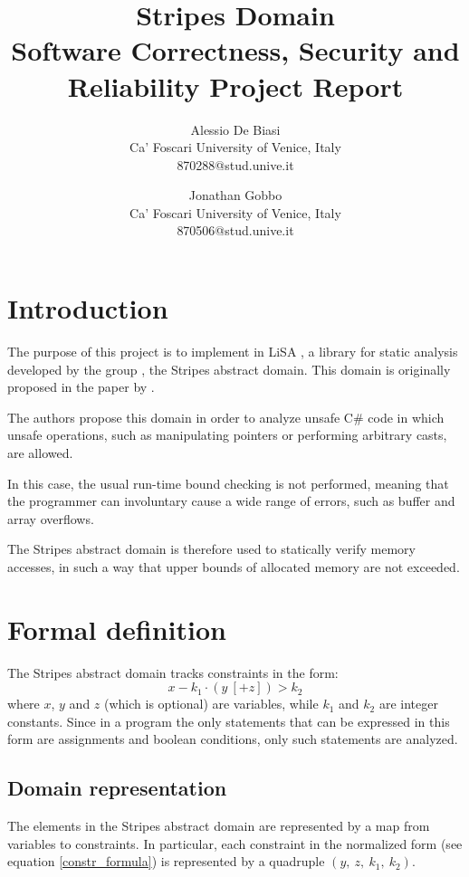 \documentclass{article}
\title{\Huge
\textbf{Stripes Domain}\\[0.5em]
\large  Software Correctness, Security and Reliability Project Report
}
\author{\large Alessio De Biasi\\ 
        \normalsize Ca’ Foscari University of Venice, Italy\\
        \normalsize 870288@stud.unive.it
        \and
        \large Jonathan Gobbo\\
        \normalsize Ca’ Foscari University of Venice, Italy\\
        \normalsize 870506@stud.unive.it
}
\date{}
\newcommand{\spc}{\:}
\begin{document}
\twocolumn
\maketitle





\section{Introduction}

The purpose of this project is to implement in LiSA \cite{lisa}, a library for static analysis developed by the group \citeauthor{lisa},  the Stripes abstract domain.
This domain is originally proposed in the paper  \cite{ferrara} by \citeauthor{ferrara}.

The authors propose this domain in order to analyze unsafe C\# code in which unsafe operations, such as manipulating pointers or performing arbitrary casts, are allowed.

In this case, the usual run-time bound checking is not performed, meaning that the programmer can involuntary cause a wide range of errors, such as buffer and array overflows.

The Stripes abstract domain is therefore used to statically verify memory accesses, in such a way that upper bounds of allocated memory are not exceeded.


\section{Formal definition}

The Stripes abstract domain tracks constraints in the form:
\begin{equation}
\label{constr_formula}
    x - k_1\cdot(y\ [+z]) > k_2
\end{equation}
\noindent
where $x$, $y$ and $z$ (which is optional) are variables, while $k_1$ and $k_2$ are integer constants.
Since in a program the only statements that can be expressed in this form are assignments and boolean conditions, only such statements are analyzed.


\subsection{Domain representation}
The elements in the Stripes abstract domain are represented by a map from variables to constraints.
In particular, each constraint in the normalized form (see equation \ref{constr_formula}) is represented by a quadruple $(y,\spc z,\spc k_1,\spc k_2)$.
\end{document}
